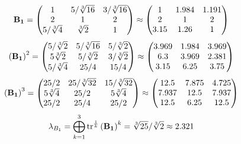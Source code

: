 \documentclass[10pt,a4paper]{article}
\begin{document}
	\[
		\bold{B_1} = 
		\begin{pmatrix}
			{1}{} & {{5}} / {\sqrt[3]{16}} & {{3}} / {\sqrt[3]{16}} \\
			{{2}}{} & {1}{} & {{2}}{} \\
			{{5}} / {\sqrt[3]{4}} & {\sqrt[3]{2}}{} & {1}{} \\
		\end{pmatrix}
		\approx
		\begin{pmatrix}
			1        & 1.984    & 1.191    \\
			2        & 1        & 2        \\
			3.15     & 1.26     & 1        \\
		\end{pmatrix}
	\]
	\[
		\left(\bold{B_1}\right)^{2} = 
		\begin{pmatrix}
			{{5}} / {\sqrt[3]{2}} & {{5}} / {\sqrt[3]{16}} & {{5}} / {\sqrt[3]{2}} \\
			{{5}\sqrt[3]{2}}{} & {{5}} / {\sqrt[3]{2}} & {{3}} / {\sqrt[3]{2}} \\
			{{5}} / {\sqrt[3]{4}} & {{25}} / {{4}} & {{15}} / {{4}} \\
		\end{pmatrix}
		\approx
		\begin{pmatrix}
			3.969    & 1.984    & 3.969    \\
			6.3      & 3.969    & 2.381    \\
			3.15     & 6.25     & 3.75     \\
		\end{pmatrix}
	\]
	\[
		\left(\bold{B_1}\right)^{3} = 
		\begin{pmatrix}
			{{25}} / {{2}} & {{25}} / {\sqrt[3]{32}} & {{15}} / {\sqrt[3]{32}} \\
			{{5}\sqrt[3]{4}}{} & {{25}} / {{2}} & {{5}\sqrt[3]{4}}{} \\
			{{25}} / {{2}} & {{25}} / {{4}} & {{25}} / {{2}} \\
		\end{pmatrix}
		\approx
		\begin{pmatrix}
			12.5     & 7.875    & 4.725    \\
			7.937    & 12.5     & 7.937    \\
			12.5     & 6.25     & 12.5     \\
		\end{pmatrix}
	\]
	\[
		\lambda_{B_1} =  \bigoplus ^{3} _{k = 1} \operatorname{tr} ^{\frac 1 k} \left( \bold{B_1} \right)^k = {\sqrt[3]{25}} / {\sqrt[3]{2}}\approx 2.321
	\]
\end{document}
